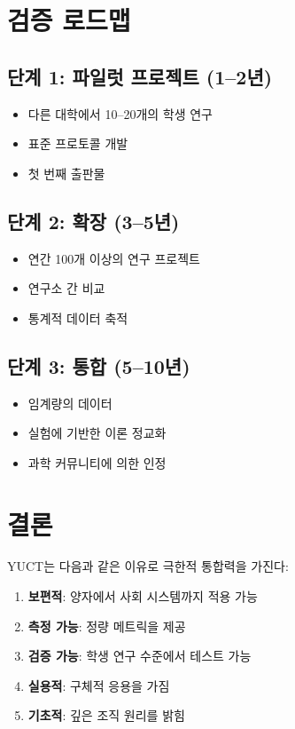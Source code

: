 \documentclass[12pt,a4paper]{article}
\begin{document}
	\section{검증 로드맵}
	
	\subsection{단계 1: 파일럿 프로젝트 (1–2년)}
	\begin{itemize}
		\item 다른 대학에서 10–20개의 학생 연구
		\item 표준 프로토콜 개발
		\item 첫 번째 출판물
	\end{itemize}
	
	\subsection{단계 2: 확장 (3–5년)}
	\begin{itemize}
		\item 연간 100개 이상의 연구 프로젝트
		\item 연구소 간 비교
		\item 통계적 데이터 축적
	\end{itemize}
	
	\subsection{단계 3: 통합 (5–10년)}
	\begin{itemize}
		\item 임계량의 데이터
		\item 실험에 기반한 이론 정교화
		\item 과학 커뮤니티에 의한 인정
	\end{itemize}
	
	\section{결론}
	
	YUCT는 다음과 같은 이유로 극한적 통합력을 가진다:
	\begin{enumerate}
		\item \textbf{보편적}: 양자에서 사회 시스템까지 적용 가능
		\item \textbf{측정 가능}: 정량 메트릭을 제공
		\item \textbf{검증 가능}: 학생 연구 수준에서 테스트 가능
		\item \textbf{실용적}: 구체적 응용을 가짐
		\item \textbf{기초적}: 깊은 조직 원리를 밝힘
	\end{enumerate}
	
\end{document}
